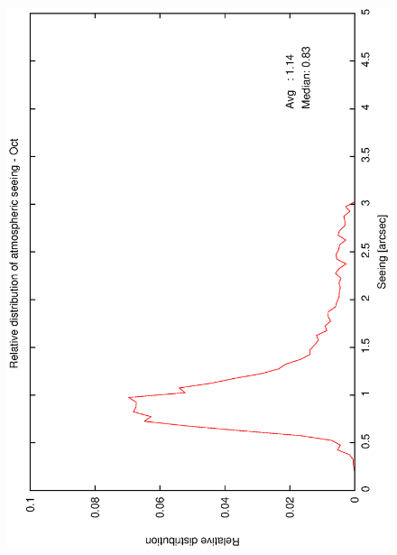 {{\begin{figure}[htbp]
\begin{center}
{   \includegraphics[scale=0.25, angle=-90]{figures/ecs/corr_see_dist_oct.eps}
  }
 \subfigure[] {
   \label{fig:see_dist_nov}
}
\end{center}
\end{figure}}}
